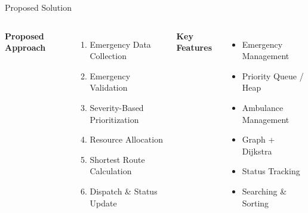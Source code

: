 \documentclass[aspectratio=169,11pt]{beamer}
\begin{document}
\begin{frame}{Proposed Solution}

\begin{columns}[T,totalwidth=\textwidth]


\textbf{\color{GEUBlue}Proposed Approach}

\begin{enumerate}
\itemsep3pt

\item Emergency Data Collection
\item Emergency Validation
\item Severity-Based Prioritization
\item Resource Allocation
\item Shortest Route Calculation
\item Dispatch \& Status Update

\end{enumerate}


\textbf{\color{GEUBlue}Key Features}

\begin{itemize}
\itemsep3pt

\item Emergency Management
\item Priority Queue / Heap
\item Ambulance Management
\item Graph + Dijkstra
\item Status Tracking
\item Searching \& Sorting

\end{itemize}

\end{columns}

\vfill


\end{frame}
\end{document}
